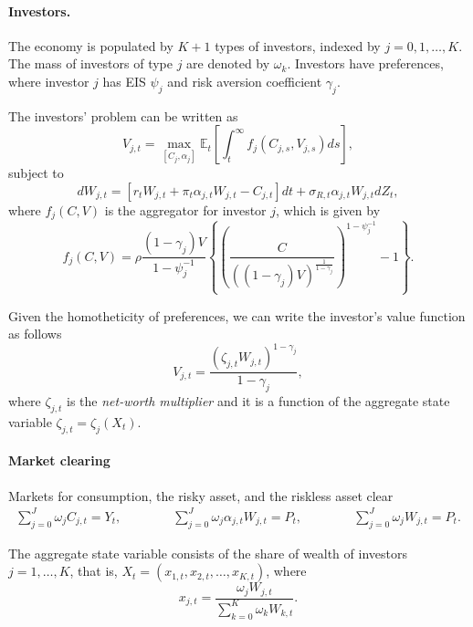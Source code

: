 \documentclass[11pt,english]{article}
\begin{document}
\paragraph{Investors.} The economy is populated by $K+1$ types of investors, indexed by $j = 0, 1, \ldots, K$. The mass of investors of type $j$ are denoted by $\omega_k$. Investors have \citet{duffie1992stochastic} preferences, where investor $j$ has EIS $\psi_j$ and risk aversion coefficient $\gamma_j$. 

The investors' problem can be written as 
\begin{equation*}
    V_{j,t} = \max_{[C_{j}, \alpha_j]} \mathbb{E}_t\left[ \int_t^\infty f_j(C_{j,s}, V_{j,s}) ds \right], 
\end{equation*}
subject to
\begin{equation*}
    d W_{j,t} = \left[ r_t W_{j,t} + \pi_t \alpha_{j,t} W_{j,t} - C_{j,t}  \right] dt + \sigma_{R,t} \alpha_{j,t} W_{j,t} d Z_t,
\end{equation*}
where $f_j(C,V)$ is the aggregator for investor $j$, which is given by
\begin{equation}
f_{j}(C, V) = \rho \frac{(1-\gamma_{j}) V}{1-\psi_j^{-1}}  \left\{ \left( \frac{C}{((1-\gamma_{j}) V)^{\frac{1}{1-\gamma_{j}}}}\right)^{1-\psi_j^{-1}} - 1\right\}.\label{EZ}
\end{equation}

Given the homotheticity of preferences, we can write the investor's value function as follows
\begin{equation}
    V_{j,t} =  \frac{(\zeta_{j,t} W_{j,t}) ^{1-\gamma_j}}{1-\gamma_j},  
\end{equation}
where $\zeta_{j,t}$ is the \textit{net-worth multiplier} and it is a function of the aggregate state variable $\zeta_{j,t} = \zeta_j(X_t)$.

\paragraph{Market clearing} Markets for consumption, the risky asset, and the riskless asset clear
\begin{align}
    \sum_{j=0}^J \omega_j C_{j,t} = Y_t, \qquad \qquad
    \sum_{j=0}^J \omega_j \alpha_{j,t} W_{j,t} = P_t, \qquad \qquad
    \sum_{j=0}^J \omega_j W_{j,t} = P_t.
\end{align}

The aggregate state variable consists of the share of wealth of investors $j=1,\ldots, K$, that is, $X_t = (x_{1,t}, x_{2,t}, \ldots, x_{K,t})$, where
\begin{equation*}
    x_{j,t} = \frac{\omega_j W_{j,t}}{\sum_{k=0}^K \omega_k W_{k,t}}.
\end{equation*}
\end{document}
